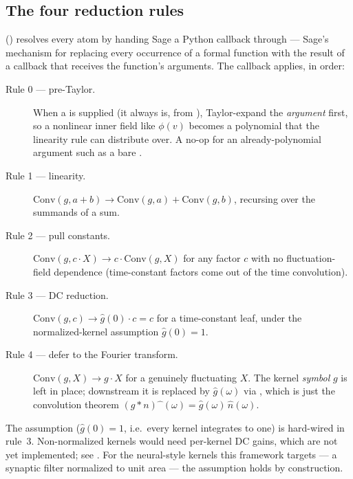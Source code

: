 \subsection{The four reduction rules}

 () resolves every
 atom by handing Sage a Python callback through
 --- Sage's mechanism for replacing
every occurrence of a formal function with the result of a callback that receives
the function's arguments. The callback applies, in order:

\begin{description}
  \item[Rule 0 --- pre-Taylor.] When a  is supplied (it always
        is, from ), Taylor-expand the \emph{argument} first, so a
        nonlinear inner field like $\phi(v)$ becomes a polynomial that the linearity
        rule can distribute over. A no-op for an already-polynomial argument such as
        a bare .
  \item[Rule 1 --- linearity.] $\mathrm{Conv}(g, a+b)\to\mathrm{Conv}(g,a)+\mathrm{Conv}(g,b)$,
        recursing over the summands of a sum.
  \item[Rule 2 --- pull constants.] $\mathrm{Conv}(g, c\cdot X)\to c\cdot\mathrm{Conv}(g,X)$
        for any factor $c$ with no fluctuation-field dependence (time-constant
        factors come out of the time convolution).
  \item[Rule 3 --- DC reduction.] $\mathrm{Conv}(g, c)\to\hat g(0)\cdot c = c$ for a
        time-constant leaf, under the normalized-kernel assumption $\hat g(0)=1$.
  \item[Rule 4 --- defer to the Fourier transform.] $\mathrm{Conv}(g, X)\to g\cdot X$
        for a genuinely fluctuating $X$. The kernel \emph{symbol} $g$ is left in
        place; downstream it is replaced by $\hat g(\omega)$ via
        , which is just the convolution theorem
        $(g\ast n)\hat{\phantom{x}}(\omega)=\hat g(\omega)\,\hat n(\omega)$.
\end{description}

\begin{gotcha}
The  assumption ($\hat g(0)=1$, i.e.\ every kernel integrates
to one) is hard-wired in rule~3. Non-normalized kernels would need per-kernel DC
gains, which are not yet implemented; see . For the
neural-style kernels this framework targets --- a synaptic filter normalized to unit
area --- the assumption holds by construction.
\end{gotcha}

